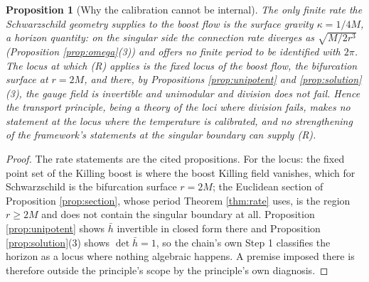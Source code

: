 \documentclass[11pt]{article}
\newtheorem{proposition}[theorem]{Proposition}
\theoremstyle{definition}
\newcommand{\hb}{\bar{h}}
\begin{document}
\begin{proposition}[Why the calibration cannot be internal]\label{prop:horizon}
The only finite rate the Schwarzschild geometry supplies to the boost flow is the surface gravity $\kappa = 1/4M$, a horizon quantity: on the singular side the connection rate diverges as $\sqrt{M/2r^{3}}$ (Proposition \ref{prop:omega}(3)) and offers no finite period to be identified with $2\pi$. The locus at which (R) applies is the fixed locus of the boost flow, the bifurcation surface at $r = 2M$, and there, by Propositions \ref{prop:unipotent} and \ref{prop:solution}(3), the gauge field is invertible and unimodular and division does not fail. Hence the transport principle, being a theory of the loci where division fails, makes no statement at the locus where the temperature is calibrated, and no strengthening of the framework's statements at the singular boundary can supply (R).
\end{proposition}

\begin{proof}
The rate statements are the cited propositions. For the locus: the fixed point set of the Killing boost is where the boost Killing field vanishes, which for Schwarzschild is the bifurcation surface $r = 2M$; the Euclidean section of Proposition \ref{prop:section}, whose period Theorem \ref{thm:rate} uses, is the region $r \geq 2M$ and does not contain the singular boundary at all. Proposition \ref{prop:unipotent} shows $\hb$ invertible in closed form there and Proposition \ref{prop:solution}(3) shows $\det\hb = 1$, so the chain's own Step 1 classifies the horizon as a locus where nothing algebraic happens. A premise imposed there is therefore outside the principle's scope by the principle's own diagnosis.
\end{proof}
\end{document}
